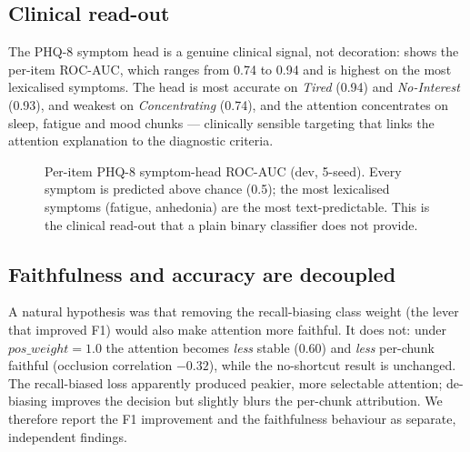 \documentclass[conference]{IEEEtran}
\begin{document}
\subsection{Clinical read-out}
The PHQ-8 symptom head is a genuine clinical signal, not decoration:
 shows the per-item ROC-AUC, which ranges from 0.74 to 0.94
and is highest on the most lexicalised symptoms. The head is most accurate on
\emph{Tired} (0.94) and \emph{No-Interest} (0.93), and weakest on
\emph{Concentrating} (0.74), and the attention concentrates on sleep, fatigue
and mood chunks --- clinically sensible targeting that links the attention
explanation to the diagnostic criteria.

\begin{figure}[t]
\centering
{}
\caption{Per-item PHQ-8 symptom-head ROC-AUC (dev, 5-seed). Every symptom is
predicted above chance (0.5); the most lexicalised symptoms (fatigue, anhedonia)
are the most text-predictable. This is the clinical read-out that a plain binary
classifier does not provide.}
\label{fig:symptom}
\end{figure}

\subsection{Faithfulness and accuracy are decoupled}
A natural hypothesis was that removing the recall-biasing class weight (the
lever that improved F1) would also make attention more faithful. It does not:
under $pos\_weight=1.0$ the attention becomes \emph{less} stable (0.60) and
\emph{less} per-chunk faithful (occlusion correlation $-0.32$), while the
no-shortcut result is unchanged. The recall-biased loss apparently produced
peakier, more selectable attention; de-biasing improves the decision but
slightly blurs the per-chunk attribution. We therefore report the F1
improvement and the faithfulness behaviour as separate, independent findings.
\end{document}
